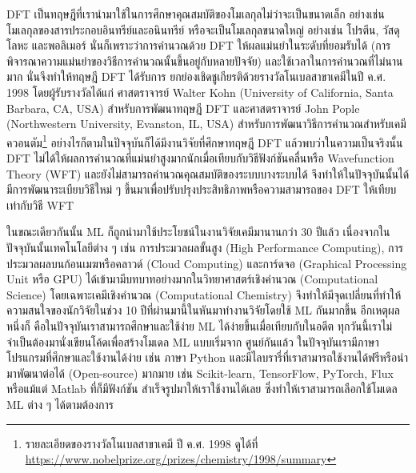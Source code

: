 DFT เป็นทฤษฎีที่เรานำมาใช้ในการศึกษาคุณสมบัติของโมเลกุลไม่ว่าจะเป็นขนาดเล็ก อย่างเช่น โมเลกุลของสารประกอบอินทรีย์และอนินทรีย์ 
หรือจะเป็นโมเลกุลขนาดใหญ่ อย่างเช่น โปรตีน, วัสดุโลหะ และพอลิเมอร์ นั่นก็เพราะว่าการคำนวณด้วย DFT ให้ผลแม่นยำในระดับที่ยอมรับได้ 
(การพิจารณาความแม่นยำของวิธีการคำนวณนั้นขึ้นอยู่กับหลายปัจจัย) และใช้เวลาในการคำนวณที่ไม่นานมาก นั่นจึงทำให้ทฤษฎี DFT ได้รับการ%
ยกย่องเชิดชูเกียรติด้วยรางวัลโนเบลสาขาเคมีในปี ค.ศ. 1998 โดยผู้รับรางวัลได้แก่ ศาสตราจารย์ Walter Kohn (University of California, 
Santa Barbara, CA, USA) สำหรับการพัฒนาทฤษฎี DFT และศาสตราจารย์ John Pople (Northwestern University, Evanston, IL, 
USA) สำหรับการพัฒนาวิธีการคำนวณสำหรับเคมีควอนตัม\footnote{รายละเอียดของรางวัลโนเบลสาขาเคมี ปี ค.ศ. 1998 ดูได้ที่ 
\url{https://www.nobelprize.org/prizes/chemistry/1998/summary}} อย่างไรก็ตามในปัจจุบันก็ได้มีงานวิจัยที่ศึกษาทฤษฎี DFT 
แล้วพบว่าในความเป็นจริงนั้น DFT ไม่ได้ให้ผลการคำนวณที่แม่นยำสูงมากนักเมื่อเทียบกับวิธีฟังก์ชันคลื่นหรือ Wavefunction Theory (WFT)%
\autocite{korth2017,janesko2021} และยังไม่สามารถคำนวณคุณสมบัติของระบบบางระบบได้ จึงทำให้ในปัจจุบันนั้นได้มีการพัฒนาระเบียบวิธีใหม่ ๆ 
ขึ้นมาเพื่อปรับปรุงประสิทธิภาพหรือความสามารถของ DFT ให้เทียบเท่ากับวิธี WFT

ในขณะเดียวกันนั้น ML ก็ถูกนำมาใช้ประโยชน์ในงานวิจัยเคมีมานานกว่า 30 ปีแล้ว เนื่องจากในปัจจุบันนั้นเทคโนโลยีต่าง ๆ เช่น การประมวลผลขั้นสูง 
(High Performance Computing), การประมวลผลบนก้อนเมฆหรือคลาวด์ (Cloud Computing) และการ์ดจอ (Graphical Processing Unit 
หรือ GPU) ได้เข้ามามีบทบาทอย่างมากในวิทยาศาสตร์เชิงคำนวณ (Computational Science) โดยเฉพาะเคมีเชิงคำนวณ (Computational 
Chemistry) จึงทำให้มีจุดเปลี่ยนที่ทำให้ความสนใจของนักวิจัยในช่วง 10 ปีที่ผ่านมานี้ในหันมาทำงานวิจัยโดยใช้ ML กันมากขึ้น อีกเหตุผลหนึ่งก็%
คือในปัจจุบันเราสามารถศึกษาและใช้ง่าย ML ได้ง่ายขึ้นเมื่อเทียบกับในอดีต ทุกวันนี้เราไม่จำเป็นต้องมานั่งเขียนโค้ดเพื่อสร้างโมเดล ML แบบเริ่มจาก%
ศูนย์กันแล้ว ในปัจจุบันเรามีภาษาโปรแกรมที่ศึกษาและใช้งานได้ง่าย เช่น ภาษา Python และมีไลบรารี่ที่เราสามารถใช้งานได้ฟรีหรือนำมาพัฒนาต่อได้ 
(Open-source) มากมาย เช่น Scikit-learn\autocite{scikit-learn}, TensorFlow\autocite{tensorflow2015-whitepaper}, 
PyTorch\autocite{NEURIPS2019_9015}, Flux\autocite{innes2018} หรือแม้แต่ Matlab\autocite{MATLAB:2010} ที่ก็มีฟังก์ชัน%
สำเร็จรูปมาให้เราใช้งานได้เลย ซึ่งทำให้เราสามารถเลือกใช้โมเดล ML ต่าง ๆ ได้ตามต้องการ


